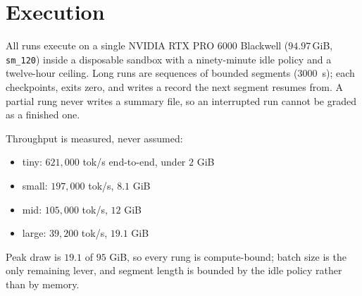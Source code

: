 \section{Execution}

All runs execute on a single NVIDIA RTX PRO 6000 Blackwell ($94.97$\,GiB,
\texttt{sm\_120}) inside a disposable sandbox with a ninety-minute idle policy and
a twelve-hour ceiling. Long runs are sequences of bounded segments
(\SI{3000}{s}); each checkpoints, exits zero, and writes a record the next segment
resumes from. A partial rung never writes a summary file, so an interrupted run
cannot be graded as a finished one.

Throughput is measured, never assumed:
\begin{itemize}
  \item tiny: $621{,}000$ tok/s end-to-end, under $2$ GiB
  \item small: $197{,}000$ tok/s, $8.1$ GiB
  \item mid: $105{,}000$ tok/s, $12$ GiB
  \item large: $39{,}200$ tok/s, $19.1$ GiB
\end{itemize}
Peak draw is $19.1$ of $95$ GiB, so every rung is compute-bound; batch size is the
only remaining lever, and segment length is bounded by the idle policy rather than
by memory.
